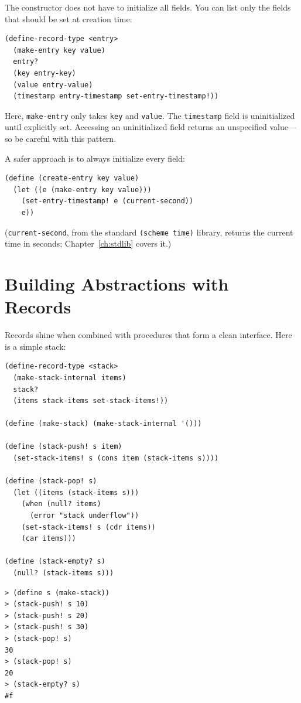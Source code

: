 The constructor does not have to initialize all fields. You can list only the fields that should be set at creation time:

\begin{lstlisting}
(define-record-type <entry>
  (make-entry key value)
  entry?
  (key entry-key)
  (value entry-value)
  (timestamp entry-timestamp set-entry-timestamp!))
\end{lstlisting}

Here, \texttt{make-entry} only takes \texttt{key} and \texttt{value}. The \texttt{timestamp} field is uninitialized until explicitly set. Accessing an uninitialized field returns an unspecified value---so be careful with this pattern.

A safer approach is to always initialize every field:

\begin{lstlisting}
(define (create-entry key value)
  (let ((e (make-entry key value)))
    (set-entry-timestamp! e (current-second))
    e))
\end{lstlisting}

(\texttt{current-second}, from the standard \texttt{(scheme time)} library, returns the current time in seconds; Chapter~\ref{ch:stdlib} covers it.)

\section{Building Abstractions with Records}

Records shine when combined with procedures that form a clean interface. Here is a simple stack:

\begin{lstlisting}
(define-record-type <stack>
  (make-stack-internal items)
  stack?
  (items stack-items set-stack-items!))

(define (make-stack) (make-stack-internal '()))

(define (stack-push! s item)
  (set-stack-items! s (cons item (stack-items s))))

(define (stack-pop! s)
  (let ((items (stack-items s)))
    (when (null? items)
      (error "stack underflow"))
    (set-stack-items! s (cdr items))
    (car items)))

(define (stack-empty? s)
  (null? (stack-items s)))
\end{lstlisting}

\begin{lstlisting}[style=repl]
> (define s (make-stack))
> (stack-push! s 10)
> (stack-push! s 20)
> (stack-push! s 30)
> (stack-pop! s)
30
> (stack-pop! s)
20
> (stack-empty? s)
#f
\end{lstlisting}

